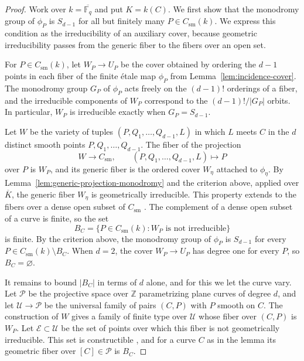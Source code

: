 \documentclass[12pt,reqno]{amsart}
\theoremstyle{definition}
\theoremstyle{remark}
\newcommand{\Fq}{\mathbb{F}_q}
\begin{document}
\begin{proof}
Work over $k=\overline{\Fq}$ and put $K=k(C)$. We first show that the monodromy group of $\phi_P$ is $S_{d-1}$ for all but finitely many $P\in C_{\mathrm{sm}}(k)$. We express this condition as the irreducibility of an auxiliary cover, because geometric irreducibility passes from the generic fiber to the fibers over an open set.

For $P\in C_{\mathrm{sm}}(k)$, let $W_P\to U_P$ be the cover obtained by ordering the $d-1$ points in each fiber of the finite \'etale map $\phi_P$ from Lemma~\ref{lem:incidence-cover}. The monodromy group $G_P$ of $\phi_P$ acts freely on the $(d-1)!$ orderings of a fiber, and the irreducible components of $W_P$ correspond to the $(d-1)!/|G_P|$ orbits. In particular, $W_P$ is irreducible exactly when $G_P=S_{d-1}$.

Let $W$ be the variety of tuples $(P,Q_1,\ldots,Q_{d-1},L)$ in which $L$ meets $C$ in the $d$ distinct smooth points $P,Q_1,\ldots,Q_{d-1}$. The fiber of the projection
\[
W\longrightarrow C_{\mathrm{sm}},
\qquad (P,Q_1,\ldots,Q_{d-1},L)\longmapsto P
\]
over $P$ is $W_P$, and its generic fiber is the ordered cover $W_\eta$ attached to $\phi_\eta$. By Lemma~\ref{lem:generic-projection-monodromy} and the criterion above, applied over $\overline K$, the generic fiber $W_\eta$ is geometrically irreducible. This property extends to the fibers over a dense open subset of $C_{\mathrm{sm}}$ \cite[Tag~0559]{Stacks}. The complement of a dense open subset of a curve is finite, so the set
\[
B_C=\{P\in C_{\mathrm{sm}}(k):W_P\text{ is not irreducible}\}
\]
is finite. By the criterion above, the monodromy group of $\phi_P$ is $S_{d-1}$ for every $P\in C_{\mathrm{sm}}(k)\setminus B_C$. When $d=2$, the cover $W_P\to U_P$ has degree one for every $P$, so $B_C=\varnothing$.

It remains to bound $|B_C|$ in terms of $d$ alone, and for this we let the curve vary. Let $\mathcal P$ be the projective space over $\mathbb Z$ parametrizing plane curves of degree $d$, and let $\mathcal U\to\mathcal P$ be the universal family of pairs $(C,P)$ with $P$ smooth on $C$. The construction of $W$ gives a family of finite type over $\mathcal U$ whose fiber over $(C,P)$ is $W_P$. Let $\mathcal E\subset\mathcal U$ be the set of points over which this fiber is not geometrically irreducible. This set is constructible \cite[Tag~055B]{Stacks}, and for a curve $C$ as in the lemma its geometric fiber over $[C]\in\mathcal P$ is $B_C$.


\end{proof}
\end{document}

